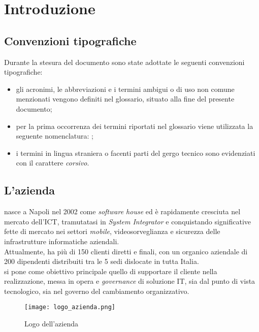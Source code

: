 
\chapter{Introduzione}
\label{cap:introduzione}
\section{Convenzioni tipografiche}
\label{sec:convenzioni tipografiche}
Durante la stesura del documento sono state adottate le seguenti convenzioni
tipografiche:
\begin{itemize}
    \item gli acronimi, le abbreviazioni e i termini ambigui o di uso non
          comune menzionati vengono definiti nel glossario, situato alla fine del
          presente documento;
    \item per la prima occorrenza dei termini riportati nel glossario viene
          utilizzata la seguente nomenclatura: {\color{RoyalBlue}{parola\glsfirstoccur}};
    \item i termini in lingua straniera o facenti parti del gergo tecnico
          sono evidenziati con il carattere \emph{corsivo}.
\end{itemize}

\section{L'azienda}

\myCompany\xspace nasce a Napoli nel 2002 come \textit{software house} ed è
rapidamente cresciuta nel
mercato dell'\gls{ICT}, tramutatasi in \textit{System Integrator} e
conquistando significative fette di mercato nei settori
\textit{mobile}, videosorveglianza e sicurezza delle infrastrutture
informatiche aziendali. \\
Attualmente, \myCompany ha più di 150 clienti diretti e finali, con un organico
aziendale
di 200 dipendenti distribuiti tra le 5 sedi dislocate in tutta Italia.\\
\myCompany\xspace si pone come obiettivo principale quello di supportare il
cliente nella realizzazione,
messa in opera e \textit{governance} di soluzione IT, sia dal punto di vista
tecnologico,
sia nel governo del cambiamento organizzativo.
\begin{figure}[!h]
    \centering
    \texttt{[image: logo\_azienda.png]}
    \caption{Logo dell'azienda}
\end{figure}

